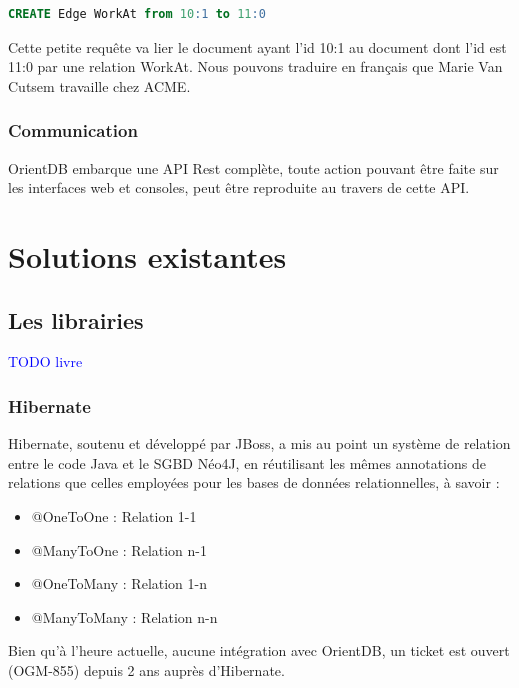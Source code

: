 \documentclass[a4paper,fleqn,12pt]{report}
\begin{document}
\begin{lstlisting}[language=SQL]
CREATE Edge WorkAt from 10:1 to 11:0
\end{lstlisting}

Cette petite requête va lier le document ayant l'id 10:1 au document dont l'id est 11:0 par une relation WorkAt. Nous pouvons traduire en français que Marie Van Cutsem travaille chez ACME.\cite{OrientDBGettingStarted}


\subsection{Communication}

OrientDB embarque une API Rest complète\cite{fielding2000architectural}, toute action pouvant être faite sur les interfaces web et consoles, peut être reproduite au travers de cette API.




\chapter{Solutions existantes}


\section{Les librairies} 

\textcolor{blue}{TODO livre}

\subsection{Hibernate}

Hibernate, soutenu et développé par JBoss, a mis au point un système de relation entre le code Java et le SGBD Néo4J, en réutilisant les mêmes annotations de relations que celles employées pour les bases de données relationnelles, à savoir :

\begin{itemize}
\item @OneToOne : Relation 1-1
\item @ManyToOne : Relation n-1
\item @OneToMany : Relation 1-n
\item @ManyToMany : Relation n-n
\end{itemize}

Bien qu'à l'heure actuelle, aucune intégration avec OrientDB, un ticket est ouvert (OGM-855) depuis 2 ans auprès d'Hibernate.
\end{document}
